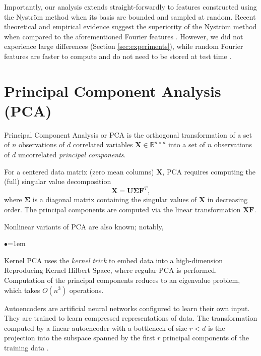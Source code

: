 \documentclass{article}
\begin{document}
  Importantly, our analysis extends straight-forwardly to features constructed
  using the Nystr\"om method \citep{Seeger01} when its basis are bounded and sampled at
  random. Recent theoretical and empirical evidence suggest the superiority of
  the Nystr\"om method when compared to the aforementioned Fourier features
  \citep{Yang12}. However, we did not experience large differences
  (Section \ref{sec:experiments}), while random Fourier features are faster to
  compute and do not need to be stored at test time \citep{Le13}.

  \section{Principal Component Analysis (PCA)} \label{sec:pca}
  Principal Component Analysis or PCA \citep{Pearson01,Jolliffe02} is the
  orthogonal transformation of a set of $n$ observations of $d$ correlated
  variables $\bm X\in\mathbb{R}^{n \times d}$ into a set of $n$ observations of
  $d$ uncorrelated \emph{principal components}.

  For a centered data matrix (zero mean columns) $\bm X$, PCA requires
  computing the (full) singular value decomposition
  \begin{equation*}
    \bm X = \bm U\bm \Sigma \bm F^T,
  \end{equation*}
  where $\bm \Sigma$ is a diagonal matrix containing the singular values of
  $\bm X$ in decreasing order. The principal components are computed via the
  {linear transformation} $\bm X\bm F$.

  {Nonlinear} variants of PCA are also known; notably,
  \begin{list}{$\bullet$}{\leftmargin=1em}
    \vspace*{-5pt}
    \setlength{\itemsep}{-1pt}
   \item Kernel PCA \citep{Schoelkopf99} uses the \emph{kernel trick} to embed
   data into a high-dimension Reproducing Kernel Hilbert Space, where regular
   PCA is performed. Computation of the principal components reduces to an
   eigenvalue problem, which takes $O(n^3)$ operations.
   \item Autoencoders \citep{Hinton06} are artificial neural networks configured
   to learn their own input.  They are trained to learn compressed
   representations of data. The transformation computed by a linear autoencoder
   with a bottleneck of size $r < d$ is the projection into the subspace
   spanned by the first $r$ principal components of the training data
   \citep{Baldi89}.
  \end{list}
\end{document}
